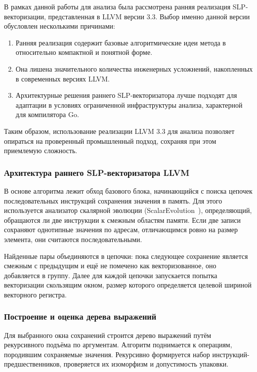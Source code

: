 В рамках данной работы для анализа была рассмотрена ранняя реализация SLP-векторизации,
представленная в LLVM версии 3.3.
Выбор именно данной версии обусловлен несколькими причинами:
\begin{enumerate}
    \item Ранняя реализация содержит базовые алгоритмические идеи метода в относительно компактной и понятной форме.
    \item Она лишена значительного количества инженерных усложнений, накопленных в современных версиях LLVM.
    \item Архитектурные решения раннего SLP-векторизатора лучше подходят для адаптации в условиях ограниченной инфраструктуры анализа, характерной для компилятора Go.
\end{enumerate}

Таким образом, использование реализации LLVM 3.3 для анализа позволяет опираться на проверенный промышленный подход,
сохраняя при этом приемлемую сложность.

\subsubsection{Архитектура раннего SLP-векторизатора LLVM}

В основе алгоритма лежит обход базового блока, начинающийся с поиска цепочек последовательных инструкций сохранения значения в память.
Для этого используется анализатор скалярной эволюции (ScalarEvolution~\cite{llvm_scev}), 
определяющий, обращаются ли две инструкции к смежным областям памяти. 
Если две записи сохраняют однотипные значения по адресам, отличающимся ровно на размер элемента, они считаются последовательными.

Найденные пары объединяются в цепочки: пока следующее сохранение является смежным с предыдущим и ещё не помечено как векторизованное, 
оно добавляется в группу. 
Далее для каждой цепочки запускается попытка векторизации скользящим окном, 
размер которого определяется целевой шириной векторного регистра.

\subsubsection{Построение и оценка дерева выражений}

Для выбранного окна сохранений строится дерево выражений путём рекурсивного подъёма по аргументам. 
Алгоритм поднимается к операциям, породившим сохраняемые значения.
Рекурсивно формируется набор инструкций-предшественников, проверяется их изоморфизм и допустимость упаковки.

